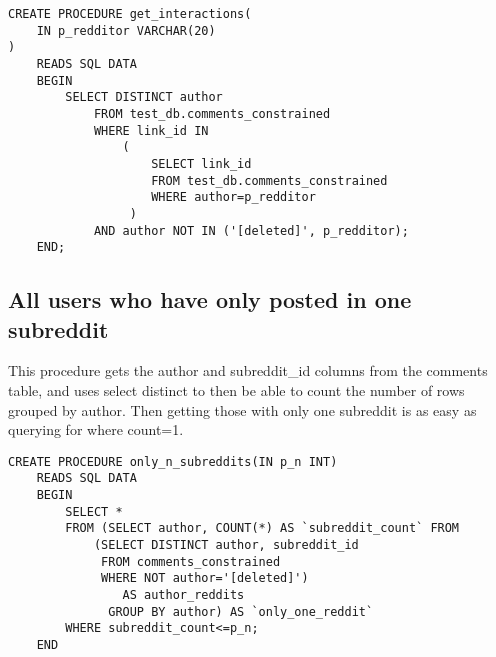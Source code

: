     \begin{verbatim}
CREATE PROCEDURE get_interactions(
    IN p_redditor VARCHAR(20)
)
    READS SQL DATA
    BEGIN
        SELECT DISTINCT author
            FROM test_db.comments_constrained
            WHERE link_id IN
                (
                    SELECT link_id
                    FROM test_db.comments_constrained
                    WHERE author=p_redditor
                 )
            AND author NOT IN ('[deleted]', p_redditor);
    END;
    \end{verbatim}

    \subsection{All users who have only posted in one subreddit} \label{subsec:only-one-subreddit}

    This procedure gets the author and subreddit\_id columns from the comments table, and uses select distinct to
    then be able to count the number of rows grouped by author.
    Then getting those with only one subreddit is as easy as querying for where count=1.

    \begin{verbatim}
CREATE PROCEDURE only_n_subreddits(IN p_n INT)
    READS SQL DATA
    BEGIN
        SELECT *
        FROM (SELECT author, COUNT(*) AS `subreddit_count` FROM
            (SELECT DISTINCT author, subreddit_id
             FROM comments_constrained
             WHERE NOT author='[deleted]')
                AS author_reddits
              GROUP BY author) AS `only_one_reddit`
        WHERE subreddit_count<=p_n;
    END
    \end{verbatim}
